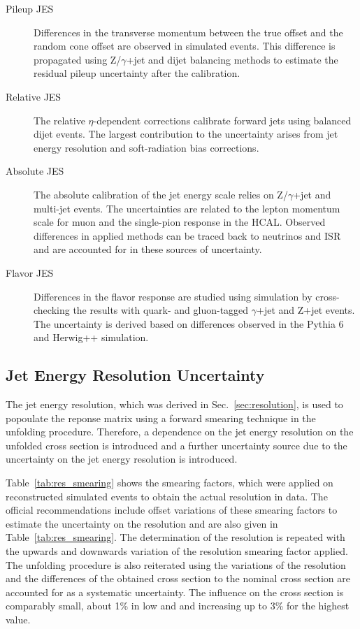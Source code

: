 \begin{description}
    \item[Pileup JES] Differences in the transverse momentum between the true
        offset and the random cone offset are observed in simulated events. This
        difference is propagated using Z/$\gamma$+jet and dijet balancing
        methods to estimate the residual pileup uncertainty after the
        calibration.
    \item[Relative JES] The relative $\eta$-dependent corrections calibrate
        forward jets using balanced dijet events. The largest contribution to
        the uncertainty arises from jet energy resolution and soft-radiation
        bias corrections. 
    \item[Absolute JES]  The absolute calibration of the jet energy scale relies
        on Z/$\gamma$+jet and multi-jet events. The uncertainties are related to
        the lepton momentum scale for muon and the single-pion response in the
        HCAL. Observed differences in applied methods can be traced back to neutrinos
        and ISR and are accounted for in these sources of uncertainty.
    \item[Flavor JES] Differences in the flavor response are studied using
        simulation by cross-checking the results with quark- and gluon-tagged
        $\gamma$+jet and Z+jet events. The uncertainty is derived based on
        differences observed in the Pythia 6 and Herwig++ simulation.
\end{description}

\subsection{Jet Energy Resolution Uncertainty}

The jet energy resolution, which was derived in Sec.~\ref{sec:resolution}, is
used to popoulate the reponse matrix using a forward smearing technique in the
unfolding procedure. Therefore, a dependence on the jet energy resolution on the
unfolded cross section is introduced and a further uncertainty source due to the
uncertainty on the jet energy resolution is introduced.

Table~\ref{tab:res_smearing} shows the smearing factors, which were applied on
reconstructed simulated events to obtain the actual resolution in data. The
official recommendations include offset variations of these smearing factors to
estimate the uncertainty on the resolution and are also given in
Table~\ref{tab:res_smearing}. The determination of the resolution is repeated
with the upwards and downwards variation of the resolution smearing factor
applied. The unfolding procedure is also reiterated using the variations of the
resolution and the differences of the obtained cross section to the nominal
cross section are accounted for as a systematic uncertainty. The influence on
the cross section is comparably small, about 1\% in low \ystar and \yboost and increasing
up to 3\% for the highest \ystar value.  

